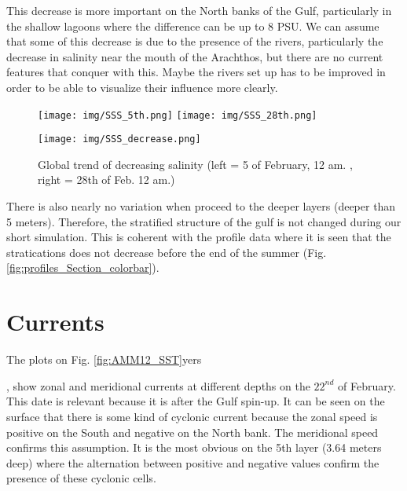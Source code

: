 \documentclass[english]{PFeENSTA}
\begin{document}
{This decrease is more important on the North banks of the Gulf, particularly in the shallow lagoons where the difference can be up to 8 PSU. 
We can assume that some of this decrease is due to the presence of the rivers, particularly the decrease in salinity near the mouth of the Arachthos, but there are no current features that conquer with this. Maybe the rivers set up has to be improved in order to be able to visualize their influence more clearly.


\begin{figure}[H]
   \begin{minipage}[h!]{1\linewidth}
   \centering
   \texttt{[image: img/SSS\_5th.png]}
   \texttt{[image: img/SSS\_28th.png]}
  \end{minipage}
   \begin{minipage}[h!]{1\linewidth}
   \centering
   \texttt{[image: img/SSS\_decrease.png]}
  \end{minipage}
 \caption{\label{fig:S_results_GlobDecrease}Global trend of decreasing salinity (left = 5 of February, 12 am. , right = 28th of Feb. 12 am.)}
\end{figure}

	
There is also nearly no variation when proceed to the deeper layers (deeper than 5 meters). Therefore, the stratified structure of the gulf is not changed during our short simulation. This is coherent with the profile data where it is seen that the stratications does not decrease before the end of the summer (Fig. \ref{fig:profiles_Section_colorbar}).



\section{Currents}

The plots on Fig. \ref{fig:AMM12_SST}yers}, show zonal and meridional currents at different depths on the $22^{nd} $ of February. This date is relevant because it is after the Gulf spin-up. 
It can be seen on the surface that there is some kind of cyclonic current because the zonal speed is positive on the South and negative on the North bank. The meridional speed confirms this assumption. It is the most obvious on the 5th layer (3.64 meters deep)  where the alternation between positive and negative values confirm the presence of these cyclonic cells.
\end{document}
